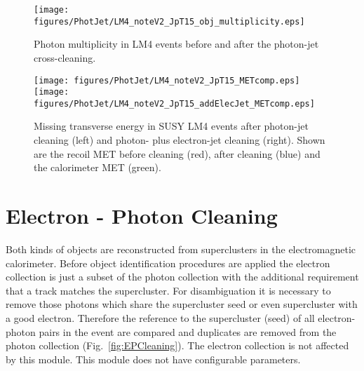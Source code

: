 \documentclass{cmspaper}
\begin{document}
\begin{figure}[hbtp]
  \begin{center}
      \texttt{[image: figures/PhotJet/LM4\_noteV2\_JpT15\_obj\_multiplicity.eps]}
    \caption{Photon multiplicity in LM4 events before and after the photon-jet
    cross-cleaning.}
    \label{fig:pjLM4mult}
  \end{center}
\end{figure}

\begin{figure}[hbtp]
  \begin{center}
      \texttt{[image: figures/PhotJet/LM4\_noteV2\_JpT15\_METcomp.eps]}
      \texttt{[image: figures/PhotJet/LM4\_noteV2\_JpT15\_addElecJet\_METcomp.eps]}
    \caption{Missing transverse energy in SUSY LM4 events after photon-jet
    cleaning (left) and photon- plus electron-jet cleaning (right). Shown are
    the recoil MET before cleaning (red), after cleaning (blue) and the
    calorimeter MET (green).}
    \label{fig:pjLM4MET}
  \end{center}
\end{figure}



\clearpage
\section{Electron - Photon Cleaning}
Both kinds of objects are reconstructed from superclusters in the
electromagnetic calorimeter. Before object identification procedures are
applied the electron collection is just a subset of the photon collection with
the additional requirement that a track matches the supercluster. For
disambiguation it is necessary to remove those photons which share the
supercluster seed or even supercluster with a good electron.  Therefore the
reference to the supercluster (seed) of all electron-photon pairs in the event
are compared and duplicates are removed from the photon collection
(Fig.~\ref{fig:EPCleaning}). The electron collection is not affected by this
module. This module does not have configurable parameters.
\end{document}
